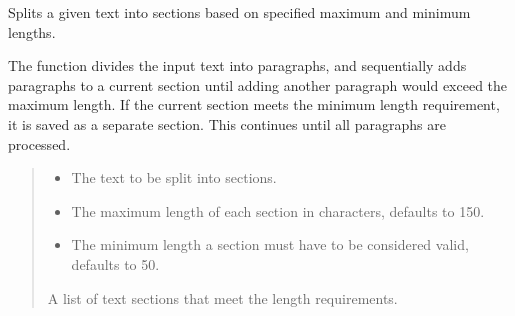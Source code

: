 \documentclass[letterpaper,10pt,english,openany,oneside]{sphinxmanual}
\begin{document}
\begin{fulllineitems}
\label{\detokenize{generation:tools.pipeline.split_text_into_sections}}
\pysigstartsignatures
{}
\pysigstopsignatures
\sphinxAtStartPar
Splits a given text into sections based on specified maximum and minimum lengths.

\sphinxAtStartPar
The function divides the input text into paragraphs, and sequentially adds paragraphs
to a current section until adding another paragraph would exceed the maximum length.
If the current section meets the minimum length requirement, it is saved as a separate
section. This continues until all paragraphs are processed.
\begin{quote}\begin{description}
\begin{itemize}
\item {} 
\sphinxAtStartPar
{} \textendash{} The text to be split into sections.

\item {} 
\sphinxAtStartPar
{} \textendash{} The maximum length of each section in characters, defaults to 150.

\item {} 
\sphinxAtStartPar
{} \textendash{} The minimum length a section must have to be considered valid, defaults to 50.

\end{itemize}

\sphinxAtStartPar
A list of text sections that meet the length requirements.

\end{description}\end{quote}

\end{fulllineitems}
\end{document}
